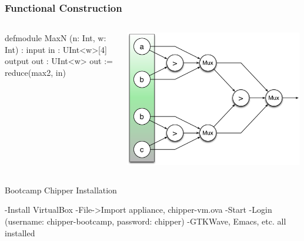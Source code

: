 \documentclass[xcolor=pdflatex,dvipsnames,table]{beamer}
\begin{document}
\begin{frame}[fragile]
\frametitle{Functional Construction}

\begin{columns}


{
\begin{stanza}
defmodule MaxN (n: Int, w: Int) :
  input in : UInt<w>[4]
  output out : UInt<w>
  out := reduce(max2, in)
\end{stanza}
}


\begin{center}
\includegraphics[width=0.99\textwidth]{figs/reduceMax.pdf} \\
\end{center}

\end{columns}

\end{frame}

% 

\begin{frame}[fragile]{Bootcamp Chipper Installation}
\begin{stanza}
-Install VirtualBox
-File->Import appliance, chipper-vm.ova
-Start
-Login (username: chipper-bootcamp, password: chipper)
-GTKWave, Emacs, etc. all installed
\end{stanza}
\end{frame}
\end{document}
